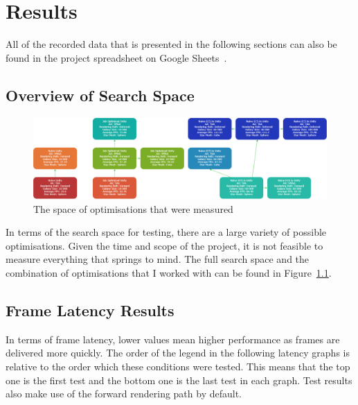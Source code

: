 \chapter{Results}
All of the recorded data that is presented in the following sections can also be found in the project spreadsheet on Google Sheets~\cite{projectSpreadsheet}. 

\section{Overview of Search Space}
\begin{figure}[tbph]
    \centering
    \includegraphics[width=1\textwidth]{Figures/SearchSpace.png}
    \caption[Optimisation Search Space And Combinations]{The space of optimisations that were measured}
    \label{fig:searchspace}
\end{figure}

In terms of the search space for testing, there are a large variety of possible optimisations. Given the time and scope of the project, it is not feasible to measure everything that springs to mind. The full search space and the combination of optimisations that I worked with can be found in Figure~\ref{fig:searchspace}.

\section{Frame Latency Results}
In terms of frame latency, lower values mean higher performance as frames are delivered more quickly. The order of the legend in the following latency graphs is relative to the order which these conditions were tested. This means that the top one is the first test and the bottom one is the last test in each graph. Test results also make use of the forward rendering path by default. 

